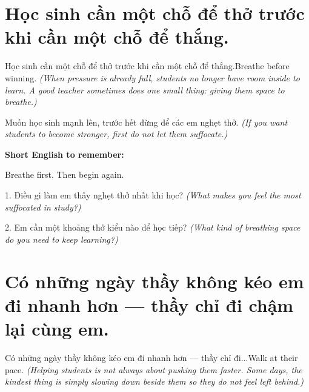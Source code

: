 \section{Học sinh cần một chỗ để thở trước khi cần một chỗ để thắng.}
\begin{truyen}{Học sinh cần một chỗ để thở trước khi cần một chỗ để thắng.}{Breathe before winning.}
\textit{(When pressure is already full, students no longer have room inside to learn. A good teacher sometimes does one small thing: giving them space to breathe.)}
\end{truyen}

\begin{baihoc}
Muốn học sinh mạnh lên, trước hết đừng để các em nghẹt thở.
\textit{(If you want students to become stronger, first do not let them suffocate.)}
\end{baihoc}

\begin{ghinhoanh}
\textbf{Short English to remember:}

Breathe first. Then begin again.

\end{ghinhoanh}

\begin{tuhocnhanh}
1. Điều gì làm em thấy nghẹt thở nhất khi học? \textit{(What makes you feel the most suffocated in study?)}

2. Em cần một khoảng thở kiểu nào để học tiếp? \textit{(What kind of breathing space do you need to keep learning?)}
\end{tuhocnhanh}
\ngancach


\section{Có những ngày thầy không kéo em đi nhanh hơn — thầy chỉ đi chậm lại cùng em.}
\begin{truyen}{Có những ngày thầy không kéo em đi nhanh hơn — thầy chỉ đi...}{Walk at their pace.}
\textit{(Helping students is not always about pushing them faster. Some days, the kindest thing is simply slowing down beside them so they do not feel left behind.)}
\end{truyen}

